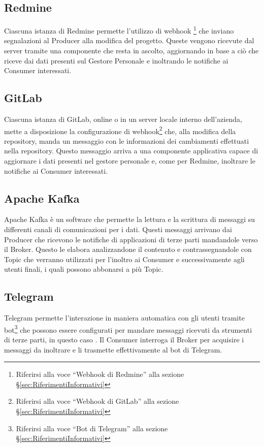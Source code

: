 		\subsection{Redmine}
		Ciascuna istanza di Redmine permette l'utilizzo di webhook
        \footnote{Riferirsi alla voce ``Webhook di Redmine'' alla sezione \S\ref{sec:RiferimentiInformativi}}
        che inviano segnalazioni al Producer alla modifica del progetto.
		Queste vengono ricevute dal server tramite una componente che resta in ascolto, aggiornando in base a ciò che riceve dai dati presenti sul Gestore Personale e inoltrando le notifiche ai Consumer interessati.
		
		\subsection{GitLab}
		Ciascuna istanza di GitLab, online o in un server locale interno dell'azienda,
        mette a disposizione la configurazione di webhook\footnote{Riferirsi alla voce ``Webhook di GitLab'' alla sezione \S\ref{sec:RiferimentiInformativi}}
        che, alla modifica della repository, manda un messaggio con le informazioni dei cambiamenti effettuati nella repository.
        Questo messaggio arriva a una componente applicativa capace di
        aggiornare i dati presenti nel gestore personale e, come per Redmine, inoltrare le notifiche ai Consumer interessati.
		
		\subsection{Apache Kafka}
		Apache Kafka è un software  che permette la lettura e la scrittura di messaggi su differenti canali di comunicazioni per i dati.
		Questi messaggi arrivano dai Producer che ricevono le notifiche di applicazioni di terze parti mandandole verso il Broker. Questo le elabora analizzandone
        il contenuto e contrassegnandole con Topic che verranno utilizzati per l'inoltro ai Consumer e successivamente agli utenti finali, i quali possono abbonarsi a più Topic.
		
		\subsection{Telegram}
		Telegram permette l'interazione in maniera automatica con gli utenti tramite
        bot\footnote{Riferirsi alla voce ``Bot di Telegram'' alla sezione \S\ref{sec:RiferimentiInformativi}}
        che possono essere configurati per mandare messaggi ricevuti da strumenti di terze parti, in questo caso \progetto.
		Il Consumer interroga il Broker per acquisire i messaggi da inoltrare e li trasmette effettivamente al bot di Telegram.
		

